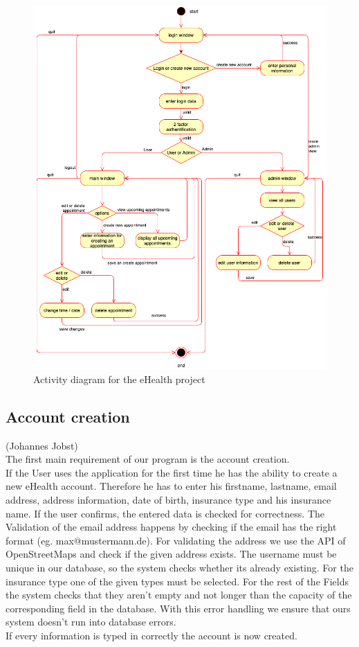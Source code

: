 \documentclass[a4paper, 12pt]{report}
\begin{document}
\begin{figure}
	\includegraphics[width=\linewidth]{eHealth_Activity.png}
	\caption{Activity diagram for the eHealth project}
\end{figure}

\subsection{Account creation}
{\tiny (Johannes Jobst)\\}
The first main requirement of our program is the account creation.\\
If the User uses the application for the first time he has the ability to create a new eHealth account. Therefore he has to enter his firstname, lastname, email address, address information, date of birth, insurance type and his insurance name.
If the user confirms, the entered data is checked for correctness.
The Validation of the email address happens by checking if the email has the right format (eg. max@mustermann.de). For validating the address we use the API of OpenStreetMaps and check if the given address exists.
The username must be unique in our database, so the system checks whether its already existing. For the insurance type one of the given types must be selected.
For the rest of the Fields the system checks that they aren't empty and not longer than the capacity of the corresponding field in the database.
With this error handling we ensure that ours system doesn't run into database errors.\\
If every information is typed in correctly the account is now created.
\end{document}
